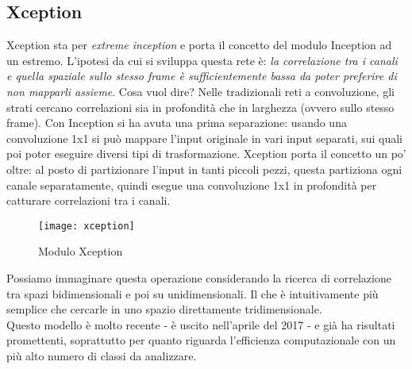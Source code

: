 \subsection*{Xception}
Xception sta per \textit{extreme inception} e porta il concetto del modulo Inception ad un estremo. L'ipotesi da cui si sviluppa questa rete è: \textit{la correlazione tra i canali e quella spaziale sullo stesso frame è sufficientemente bassa da poter preferire di non mapparli assieme}.
Cosa vuol dire? Nelle tradizionali reti a convoluzione, gli strati cercano correlazioni sia in profondità che in larghezza (ovvero sullo stesso frame). Con Inception si ha avuta una prima separazione: usando una convoluzione 1x1 si può mappare l'input originale in vari input separati, sui quali poi poter eseguire diversi tipi di trasformazione. Xception porta il concetto un po' oltre: al posto di partizionare l'input in tanti piccoli pezzi, questa partiziona ogni canale separatamente, quindi esegue una convoluzione 1x1 in profondità per catturare correlazioni tra i canali.
\begin{figure}[H] 
	\centering
	\texttt{[image: xception]} 
	\caption{Modulo Xception}
	\label{img:xception_module}
\end{figure}
Possiamo immaginare questa operazione considerando la ricerca di correlazione tra spazi bidimensionali e poi su unidimensionali. Il che è intuitivamente più semplice che cercarle in uno spazio direttamente tridimensionale.
\medskip
\\Questo modello è molto recente - è uscito nell'aprile del 2017 - e già ha risultati promettenti, soprattutto per quanto riguarda l'efficienza computazionale con un più alto numero di \gls{classi} da analizzare.


